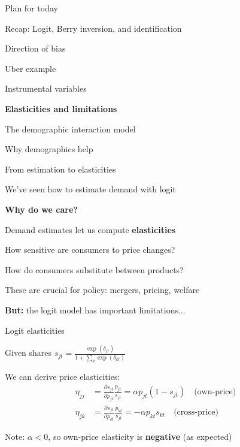 \documentclass[notes,11pt, aspectratio=169]{beamer}
\newenvironment{wideitemize}{\itemize\addtolength{\itemsep}{10pt}}{\enditemize}
\newenvironment{wideenumerate}{\enumerate\addtolength{\itemsep}{10pt}}{\endenumerate}
\begin{document}
\begin{frame}{Plan for today}
  \begin{wideenumerate}
    \item Recap: Logit, Berry inversion, and identification
    \item Direction of bias
    \item Uber example
    \item Instrumental variables
    \item \textbf{Elasticities and limitations}
    \item The demographic interaction model
    \item Why demographics help
  \end{wideenumerate}
\end{frame}


\begin{frame}{From estimation to elasticities}
	\begin{wideitemize}
		\item We've seen how to estimate demand with logit
		\item \textbf{Why do we care?}
		\item Demand estimates let us compute \textbf{elasticities}
		\begin{wideitemize}
			\vspace{3pt}
			\item How sensitive are consumers to price changes?
			\item How do consumers substitute between products?
		\end{wideitemize}
		\item These are crucial for policy: mergers, pricing, welfare
		\item \textbf{But:} the logit model has important limitations...
	\end{wideitemize}
\end{frame}

\begin{frame}{Logit elasticities}
	\begin{wideitemize}
		\item Given shares $s_{jt} = \frac{\exp(\delta_{jt})}{1 + \sum_k \exp(\delta_{kt})}$
		\item We can derive price elasticities:
		\begin{align*}
			\eta_{jj} &= \frac{\partial s_{jt}}{\partial p_{jt}} \frac{p_{jt}}{s_{jt}} = \alpha p_{jt} (1 - s_{jt}) \quad \text{(own-price)} \\[10pt]
			\eta_{jk} &= \frac{\partial s_{jt}}{\partial p_{kt}} \frac{p_{kt}}{s_{jt}} = -\alpha p_{kt} s_{kt} \quad \text{(cross-price)}
		\end{align*}
		\item Note: $\alpha < 0$, so own-price elasticity is \textbf{negative} (as expected)
	\end{wideitemize}
\end{frame}
\end{document}
